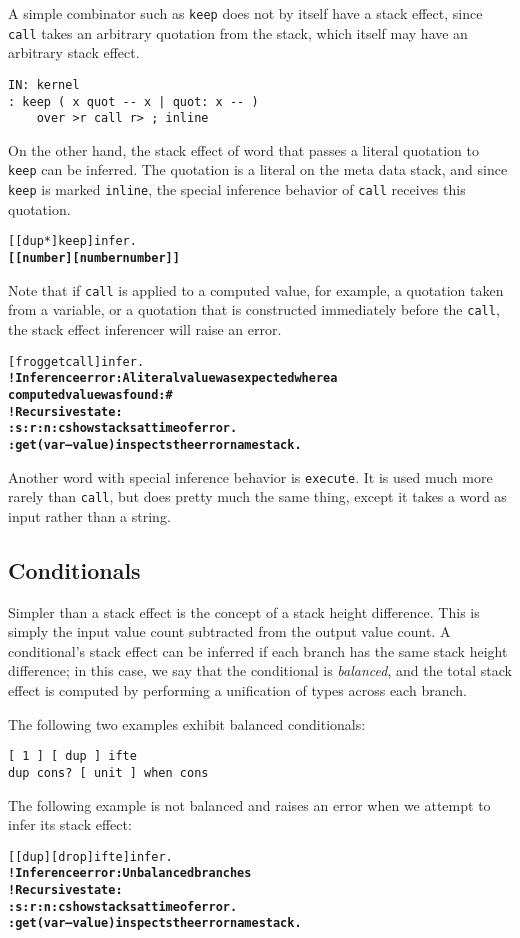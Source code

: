 \documentclass{book}
\begin{document}
A simple combinator such as \verb|keep| does not by itself have a stack effect, since \verb|call| takes an arbitrary quotation from the stack, which itself may have an arbitrary stack effect.
\begin{verbatim}
IN: kernel
: keep ( x quot -- x | quot: x -- )
    over >r call r> ; inline
\end{verbatim}
On the other hand, the stack effect of word that passes a literal quotation to \verb|keep| can be inferred. The quotation is a literal on the meta data stack, and since \verb|keep| is marked \verb|inline|, the special inference behavior of \verb|call| receives this quotation.
\begin{alltt}
  [ [ dup * ] keep ] infer .
\textbf{[ [ number ] [ number number ] ]}
\end{alltt}
Note that if \verb|call| is applied to a computed value, for example, a quotation taken from a variable, or a quotation that is constructed immediately before the \verb|call|, the stack effect inferencer will raise an error.
\begin{alltt}
  [ frog get call ] infer .
\textbf{! Inference error: A literal value was expected where a
computed value was found: \#<computed @ 716167923>
! Recursive state:
:s :r :n :c show stacks at time of error.
:get ( var -- value ) inspects the error namestack.}
\end{alltt}
Another word with special inference behavior is \verb|execute|. It is used much more rarely than \verb|call|, but does pretty much the same thing, except it takes a word as input rather than a string.

\subsection{Conditionals}

Simpler than a stack effect is the concept of a stack height difference. This is simply the input value count subtracted from the output value count. A conditional's stack effect can be inferred if each branch has the same stack height difference; in this case, we say that the conditional is \emph{balanced}, and the total stack effect is computed by performing a unification of types across each branch.

The following two examples exhibit balanced conditionals:
\begin{verbatim}
[ 1 ] [ dup ] ifte
dup cons? [ unit ] when cons
\end{verbatim}
The following example is not balanced and raises an error when we attempt to infer its stack effect:
\begin{alltt}
  [ [ dup ] [ drop ] ifte ] infer .
\textbf{! Inference error: Unbalanced branches
! Recursive state:
:s :r :n :c show stacks at time of error.
:get ( var -- value ) inspects the error namestack.}
\end{alltt}
\end{document}
